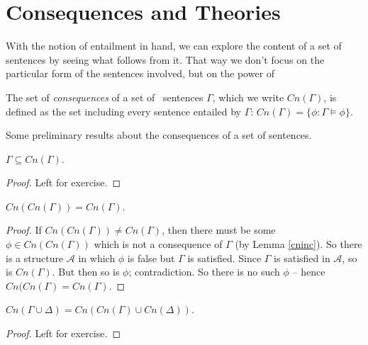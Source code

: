 \section{Consequences and Theories}
With the notion of entailment in hand, we can explore the content of a set of sentences by seeing what follows from it. That way we don't focus on the particular form of the sentences involved, but on the power of 
\begin{definition}[Consequences]
	The set of \emph{consequences} of a set of \lone\ sentences $\Gamma$, which we write $Cn(\Gamma)$, is defined as the set including every sentence entailed by $\Gamma$: $Cn(\Gamma)=\{\phi: \Gamma \vDash \phi\}$.
\end{definition}
Some preliminary results about the consequences of a set of sentences.
\begin{lemma}  $\Gamma \subseteq Cn(\Gamma)$. \label{cninc}
\begin{proof}
	Left for exercise.
\end{proof}\end{lemma}
\begin{lemma}
$Cn\left(Cn\left( \Gamma \right)  \right) = Cn (\Gamma)$. \label{confp}
	\begin{proof} If $Cn(Cn(\Gamma))≠Cn(\Gamma)$, then there must be some $\phi\in Cn(Cn(\Gamma))$ which is not a consequence of $\Gamma$ (by Lemma \ref{cninc}). So there is a structure $\mathscr{A}$ in which $\phi$ is false but $\Gamma$ is satisfied. Since $\Gamma$ is satisfied in $\mathscr{A}$, so is $Cn(\Gamma)$. But then so is $\phi$; contradiction. So there is no such $\phi$ – hence $Cn(Cn(\Gamma)=Cn(\Gamma)$.
	\end{proof}
\end{lemma}
\begin{lemma} $Cn \left( \Gamma \cup \Delta \right) = Cn \left( Cn(\Gamma) \cup Cn(\Delta) \right)$. \label{cnunion}
	\begin{proof}
		Left for exercise. 
	\end{proof}
\end{lemma}

